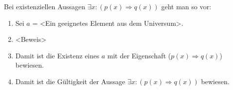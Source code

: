 Bei existenziellen Aussagen $\exists x : (p(x) \Rightarrow q(x))$
geht man so vor:
\begin{enumerate}
  \item Sei $a$ = <Ein geeignetes Element aus dem Universum>.
  \item <Beweis>
  \item Damit ist die Existenz eines $a$ mit der Eigenschaft ($p(x) \Rightarrow q(x)$) bewiesen. 
  \item Damit ist die Gültigkeit der Aussage $\exists x : (p(x) \Rightarrow q(x))$ bewiesen.
\end{enumerate}
